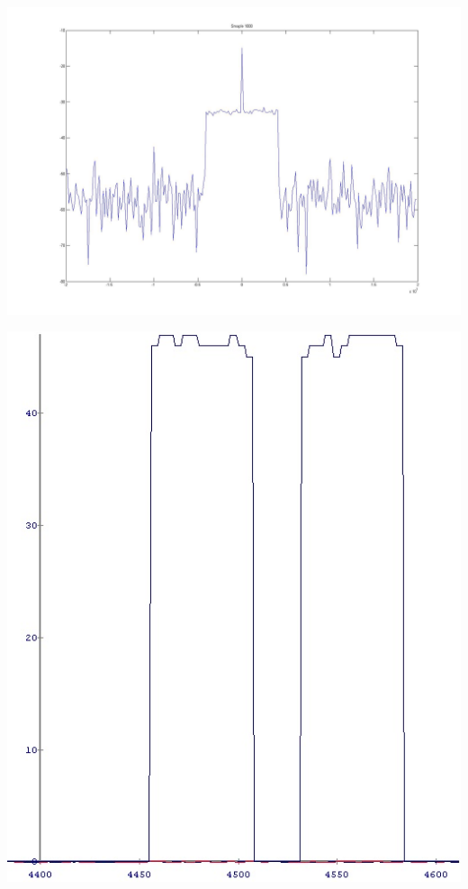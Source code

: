 \begin{center}
\includegraphics[width=\textwidth]{content/fig/Rfbase.JPG}
\label{Rfbase}
\end{center}

\begin{center}
\includegraphics[width=\textwidth]{content/fig/h_mag_chipscope.JPG}
\label{h_mag_chipscope}
\end{center}